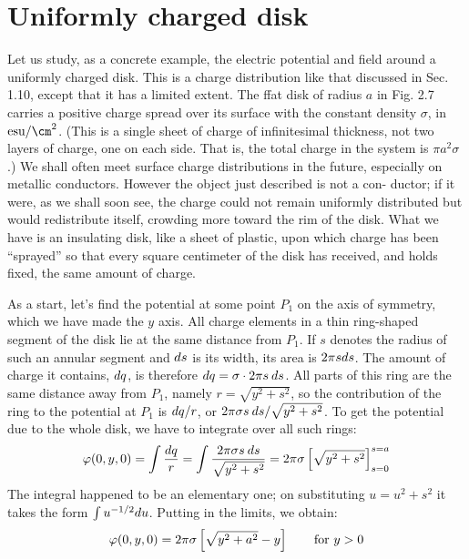 \section{Uniformly charged disk}

Let us study, as a concrete example, the electric potential and field
around a uniformly charged disk. This is a charge distribution like
that discussed in Sec. 1.10, except that it has a limited extent. The
ffat disk of radius $a$ in Fig. 2.7 carries a positive charge spread over its
surface with the constant density $\sigma$, in $\esu/\cm^2$. (This is a single sheet
of charge of infinitesimal thickness, not two layers of charge, one on
each side. That is, the total charge in the system is $\pi a^2\sigma$.) We shall
often meet surface charge distributions in the future, especially on
metallic conductors. However the object just described is not a con-
ductor; if it were, as we shall soon see, the charge could not remain
uniformly distributed but would redistribute itself, crowding more
toward the rim of the disk. What we have is an insulating disk, like
a sheet of plastic, upon which charge has been ``sprayed'' so that every
square centimeter of the disk has received, and holds fixed, the same
amount of charge.

As a start, let's find the potential at some point $P_1$ on the axis of
symmetry, which we have made the $y$ axis. All charge elements in a
thin ring-shaped segment of the disk lie at the same distance from $P_1$.
If $s$ denotes the radius of such an annular segment and $d s$ is its width,
its area is $2\pi sd s$. The amount of charge it contains, $d q$, is therefore 
$d q = \sigma\cdot 2\pi s \:d s$. All parts of this ring are the same distance away
from $P_1$, namely $r = \sqrt{y^2+s^2}$, so the contribution of the ring to the
potential at $P_1$ is $d q/r$, or $2\pi\sigma s\:d s/\sqrt{y^2+s^2}$. To get the potential
due to the whole disk, we have to integrate over all such rings:
\begin{equation}
  \varphi(0,y,0) = \int \frac{d q}{r} = \int \frac{2\pi\sigma s\:d s}{\sqrt{y^2+s^2}}
       =2\pi\sigma\left[\sqrt{y^2+s^2}\right]_{s=0}^{s=a}
\end{equation}
The integral happened to be an elementary one; on substituting
$u=u^2+s^2$ it takes the form $\int u^{-1/2}d u$. Putting in the limits, we
obtain:
\begin{equation}
  \varphi(0,y,0) = 2\pi\sigma\left[\sqrt{y^2+a^2}-y\right] \qquad \text{for $y>0$}
\end{equation}

